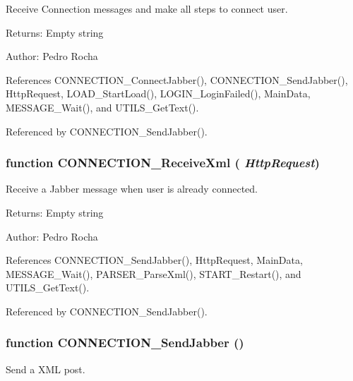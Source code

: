 Receive Connection messages and make all steps to connect user. 

\begin{Desc}
\item[Returns:]Empty string \end{Desc}
\begin{Desc}
\item[Author:]Pedro Rocha \end{Desc}


References CONNECTION\_\-ConnectJabber(), CONNECTION\_\-SendJabber(), HttpRequest, LOAD\_\-StartLoad(), LOGIN\_\-LoginFailed(), MainData, MESSAGE\_\-Wait(), and UTILS\_\-GetText().

Referenced by CONNECTION\_\-SendJabber().
\subsubsection[CONNECTION\_\-ReceiveXml]{\setlength{\rightskip}{0pt plus 5cm}function CONNECTION\_\-ReceiveXml ( {\em HttpRequest})}\label{connection_8js_c7b638f4214eba657392edce5a7ea662}


Receive a Jabber message when user is already connected. 

\begin{Desc}
\item[Returns:]Empty string \end{Desc}
\begin{Desc}
\item[Author:]Pedro Rocha \end{Desc}


References CONNECTION\_\-SendJabber(), HttpRequest, MainData, MESSAGE\_\-Wait(), PARSER\_\-ParseXml(), START\_\-Restart(), and UTILS\_\-GetText().

Referenced by CONNECTION\_\-SendJabber().
\subsubsection[CONNECTION\_\-SendJabber]{\setlength{\rightskip}{0pt plus 5cm}function CONNECTION\_\-SendJabber ()}\label{connection_8js_c49f7b7225ba663c90a59f9c2b7bff18}


Send a XML post. 

